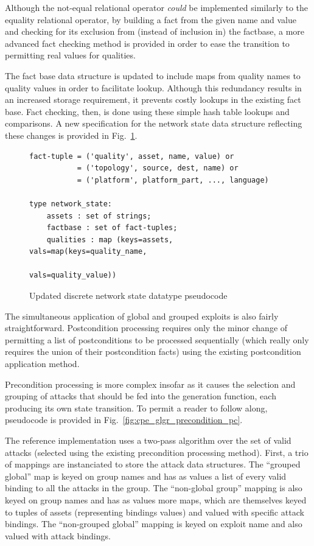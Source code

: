 Although the not-equal relational operator \emph{could} be implemented
similarly to the equality relational operator, by building a fact from the
given name and value and checking for its exclusion from (instead of inclusion 
in) the factbase, a more advanced fact checking method is provided in order 
to ease the transition to permitting real values for qualities.

The fact base data structure is updated to include maps from quality names to
quality values in order to facilitate lookup. Although this redundancy results 
in an increased storage requirement, it prevents costly lookups in the existing
fact base. Fact checking, then, is done using these simple hash
table lookups and comparisons. A new specification for the network state
data structure reflecting these changes is provided in 
Fig.~\ref{fig:netstate_map_pc}.

\begin{figure}
\begin{lstlisting}
fact-tuple = ('quality', asset, name, value) or
           = ('topology', source, dest, name) or
           = ('platform', platform_part, ..., language)

type network_state:
    assets : set of strings;
    factbase : set of fact-tuples;
    qualities : map (keys=assets, vals=map(keys=quality_name,
                                           vals=quality_value))
\end{lstlisting}
\caption{Updated discrete network state datatype pseudocode}
\label{fig:netstate_map_pc}
\end{figure}

The simultaneous application of global and grouped exploits is also
fairly straightforward. Postcondition processing requires only the minor change
of permitting a list of postconditions to be processed sequentially (which
really only requires the union of their postcondition facts) using the
existing postcondition application method.

Precondition processing is more complex insofar as it causes the selection and
grouping of attacks that should be fed into the generation function,
each producing its own state transition. To permit
a reader to follow along, pseudocode is provided in 
Fig.~\ref{fig:cpe_glgr_precondition_pc}.

The reference implementation uses a two-pass algorithm over the set of
valid attacks (selected using the existing precondition processing method).
First, a trio of mappings are instanciated to store the attack data structures.
The ``grouped global'' map is keyed on group names and has as values a list of every
valid binding to all the attacks in the group.
The ``non-global group'' mapping is also keyed on group names and has as values more maps, which are
themselves keyed to tuples of assets (representing bindings values) and valued
with specific attack bindings. The ``non-grouped global'' mapping is keyed on exploit name
and also valued with attack bindings.

